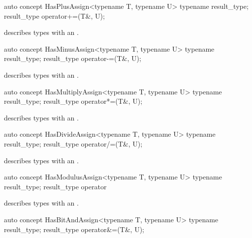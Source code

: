 \documentclass[american,twoside]{book}
\begin{document}
\begin{itemdecl}
auto concept HasPlusAssign<typename T, typename U> {
  typename result_type;
  result_type operator+=(T&, U);
}
\end{itemdecl}

\begin{itemdescr}
\pnum
\mbox{\reallynote} describes types with an \mbox{}.
\end{itemdescr}

\begin{itemdecl}
auto concept HasMinusAssign<typename T, typename U> {
  typename result_type;
  result_type operator-=(T&, U);
}
\end{itemdecl}

\begin{itemdescr}
\pnum
\mbox{\reallynote} describes types with an \mbox{}.
\end{itemdescr}

\begin{itemdecl}
auto concept HasMultiplyAssign<typename T, typename U> {
  typename result_type;
  result_type operator*=(T&, U);
}
\end{itemdecl}

\begin{itemdescr}
\pnum
\mbox{\reallynote} describes types with an \mbox{}.
\end{itemdescr}

\begin{itemdecl}
auto concept HasDivideAssign<typename T, typename U> {
  typename result_type;
  result_type operator/=(T&, U);
}
\end{itemdecl}

\begin{itemdescr}
\pnum
\mbox{\reallynote} describes types with an \mbox{}.
\end{itemdescr}

\begin{itemdecl}
auto concept HasModulusAssign<typename T, typename U> {
  typename result_type;
  result_type operator%
}
\end{itemdecl}

\begin{itemdescr}
\pnum
\mbox{\reallynote} describes types with an \mbox{}.
\end{itemdescr}

\begin{itemdecl}
auto concept HasBitAndAssign<typename T, typename U> {
  typename result_type;
  result_type operator&=(T&, U);
}
\end{itemdecl}
\end{document}
